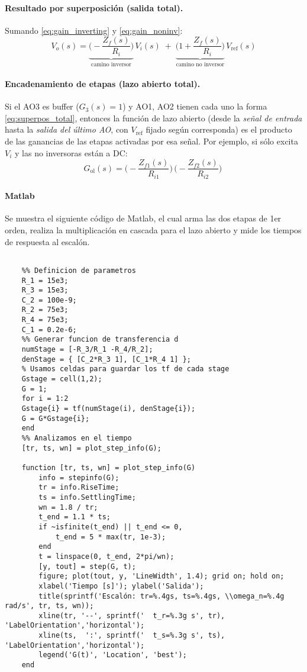 \paragraph{Resultado por superposición (salida total).}
Sumando \eqref{eq:gain_inverting} y \eqref{eq:gain_noninv}:
\begin{equation}
	V_o(s)
	= \underbrace{\Bigg(-\frac{Z_f(s)}{R_i}\Bigg)}_{\text{camino inversor}}\,V_i(s)
	\;+\;
	\underbrace{\Bigg(1+\frac{Z_f(s)}{R_i}\Bigg)}_{\text{camino no inversor}}\,V_{\text{ref}}(s)
	\label{eq:superpos_total}
\end{equation}

\paragraph{Encadenamiento de etapas (lazo abierto total).}
Si el AO3 es buffer ($G_3(s)=1$) y AO1, AO2 tienen cada uno la forma \eqref{eq:superpos_total}, entonces la función de lazo abierto (desde la \emph{señal de entrada} hasta la \emph{salida del último AO}, con $V_{\text{ref}}$ fijado según corresponda) es el producto de las ganancias de las etapas activadas por esa señal. Por ejemplo, si sólo excita $V_i$ y las no inversoras están a DC:
\[
G_{\text{ol}}(s)
= \Big(-\frac{Z_{f1}(s)}{R_{i1}}\Big)\,
\Big(-\frac{Z_{f2}(s)}{R_{i2}}\Big)\
\]
\paragraph{Matlab} Se muestra el siguiente código de Matlab, el cual arma las dos etapas de 1er orden, realiza la multiplicación en cascada para el lazo abierto y mide los tiempos de respuesta al escalón.

\onecolumn

\begin{lstlisting}[style=matlabstyle,caption={Script en Matlab},label={lst:mat}]
	
	%% Definicion de parametros
	R_1 = 15e3;
	R_3 = 15e3;
	C_2 = 100e-9;
	R_2 = 75e3;
	R_4 = 75e3;
	C_1 = 0.2e-6;
	%% Generar funcion de transferencia d
	numStage = [-R_3/R_1 -R_4/R_2];
	denStage = { [C_2*R_3 1], [C_1*R_4 1] };
	% Usamos celdas para guardar los tf de cada stage
	Gstage = cell(1,2);
	G = 1;
	for i = 1:2
	Gstage{i} = tf(numStage(i), denStage{i});
	G = G*Gstage{i};
	end
	%% Analizamos en el tiempo
	[tr, ts, wn] = plot_step_info(G);
	
	function [tr, ts, wn] = plot_step_info(G)
		info = stepinfo(G);
		tr = info.RiseTime;
		ts = info.SettlingTime;
		wn = 1.8 / tr;
		t_end = 1.1 * ts;
		if ~isfinite(t_end) || t_end <= 0, 
			t_end = 5 * max(tr, 1e-3); 
		end
		t = linspace(0, t_end, 2*pi/wn);
		[y, tout] = step(G, t);
		figure; plot(tout, y, 'LineWidth', 1.4); grid on; hold on;
		xlabel('Tiempo [s]'); ylabel('Salida');
		title(sprintf('Escalón: tr=%.4gs, ts=%.4gs, \\omega_n=%.4g rad/s', tr, ts, wn));
		xline(tr, '--', sprintf('  t_r=%.3g s', tr), 'LabelOrientation','horizontal');
		xline(ts,  ':', sprintf('  t_s=%.3g s', ts), 'LabelOrientation','horizontal');
		legend('G(t)', 'Location', 'best');
	end
	
\end{lstlisting}
\twocolumn
{}
